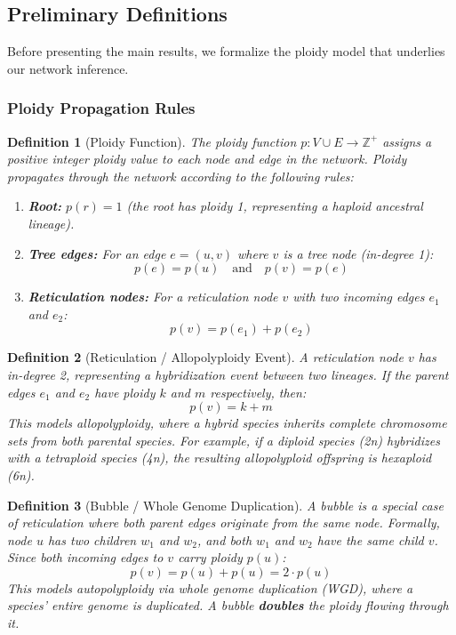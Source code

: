 \documentclass{article}
\newtheorem{definition}{\color{bluem}Definition}
\begin{document}
\subsection{Preliminary Definitions}

Before presenting the main results, we formalize the ploidy model that underlies our network inference.

\subsubsection{Ploidy Propagation Rules}

\begin{definition}[Ploidy Function]
The \textit{ploidy function} $p: V \cup E \rightarrow \mathbb{Z}^+$ assigns a positive integer ploidy value to each node and edge in the network. Ploidy propagates through the network according to the following rules:
\begin{enumerate}
    \item \textbf{Root:} $p(r) = 1$ (the root has ploidy 1, representing a haploid ancestral lineage).
    \item \textbf{Tree edges:} For an edge $e = (u, v)$ where $v$ is a tree node (in-degree 1): 
    \[p(e) = p(u) \quad \text{and} \quad p(v) = p(e)\]
    \item \textbf{Reticulation nodes:} For a reticulation node $v$ with two incoming edges $e_1$ and $e_2$:
    \[p(v) = p(e_1) + p(e_2)\]
\end{enumerate}
\end{definition}

\begin{definition}[Reticulation / Allopolyploidy Event]
A \textit{reticulation node} $v$ has in-degree 2, representing a hybridization event between two lineages. If the parent edges $e_1$ and $e_2$ have ploidy $k$ and $m$ respectively, then:
\[p(v) = k + m\]
This models \textit{allopolyploidy}, where a hybrid species inherits complete chromosome sets from both parental species. For example, if a diploid species (2n) hybridizes with a tetraploid species (4n), the resulting allopolyploid offspring is hexaploid (6n).
\end{definition}

\begin{definition}[Bubble / Whole Genome Duplication]
A \textit{bubble} is a special case of reticulation where both parent edges originate from the same node. Formally, node $u$ has two children $w_1$ and $w_2$, and both $w_1$ and $w_2$ have the same child $v$. Since both incoming edges to $v$ carry ploidy $p(u)$:
\[p(v) = p(u) + p(u) = 2 \cdot p(u)\]
This models \textit{autopolyploidy} via whole genome duplication (WGD), where a species' entire genome is duplicated. A bubble \textbf{doubles} the ploidy flowing through it.
\end{definition}
\end{document}

